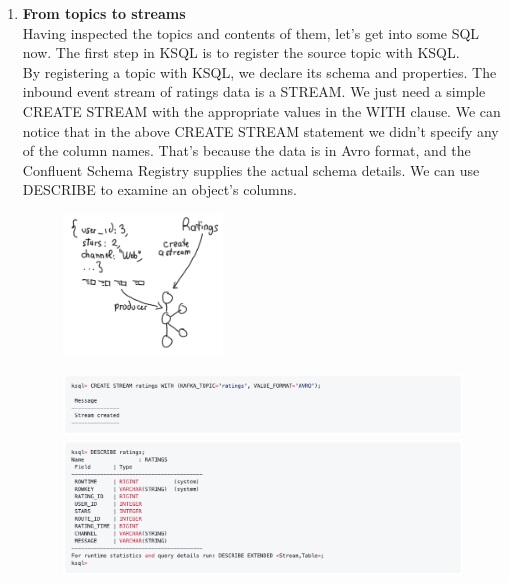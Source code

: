 \documentclass[10pt,a4paper]{article}
\begin{document}
\begin{enumerate}
  \item \textbf{From topics to streams} \\
  Having inspected the topics and contents of them, let’s get into some SQL now. The first step in KSQL is to register the source topic with KSQL. \\ 
  By registering a topic with KSQL, we declare its schema and properties. The inbound event stream of ratings data is a STREAM. We just need a simple CREATE STREAM with the appropriate values in the WITH clause. We can notice that in the above CREATE STREAM statement we didn’t specify any of the column names. That’s because the data is in Avro format, and the Confluent Schema Registry supplies the actual schema details. We can use DESCRIBE to examine an object’s columns.
  \begin{figure}[ht!]
  \hfill \includegraphics[width=120pt]{images/ksql-demo-2}\hspace*{\fill}
  \end{figure}
  \pagebreak
  \begin{figure}[ht!]
 \hfill \includegraphics[width=400pt]{images/ksql-cmd3}\hspace*{\fill}
\vspace{0.1em} \center 
 \hfill \includegraphics[width=400pt]{images/ksql-cmd4}\hspace*{\fill} 
 \end{figure}  


\end{enumerate}
\end{document}
